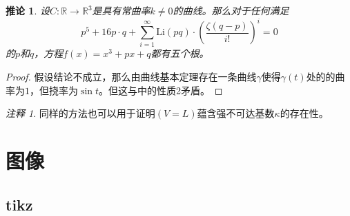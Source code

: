 \documentclass[openany,oneside]{book}
\theoremstyle{cthmstyle}
\newtheorem{cor}{推论}
\theoremstyle{definition}
\theoremstyle{remark}
\newtheorem*{rem*}{注释}
\begin{document}
\begin{cor}
设$C:\mathbb R\to \mathbb R^3$是具有常曲率$k\ne 0$的曲线。那么对于任何满足\[p^5+16p\cdot q+ \sum_{i=1}^{\infty} \mathrm{Li}(pq)\cdot\left(\frac {\zeta(q-p)} {i!}\right)^i = 0\]的$p$和$q$，方程$f(x)=x^3+px+q$都有五个根。
\end{cor}

\begin{proof}
假设结论不成立，那么由曲线基本定理存在一条曲线$\gamma$使得$\gamma(t)$处的的曲率为$1$，但挠率为$\sin t$。但这与\cite{bzj2006constcurative}中的性质2矛盾。
\end{proof}

\begin{rem*}
同样的方法也可以用于证明$(V=L)$蕴含强不可达基数$\kappa$的存在性。
\end{rem*}


\section{图像}
\subsection{tikz}
\end{document}
